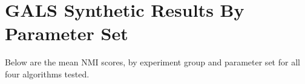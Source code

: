 \chapter{GALS Synthetic Results By Parameter Set}
Below are the mean NMI scores, by experiment group and parameter set for all four algorithms tested.
